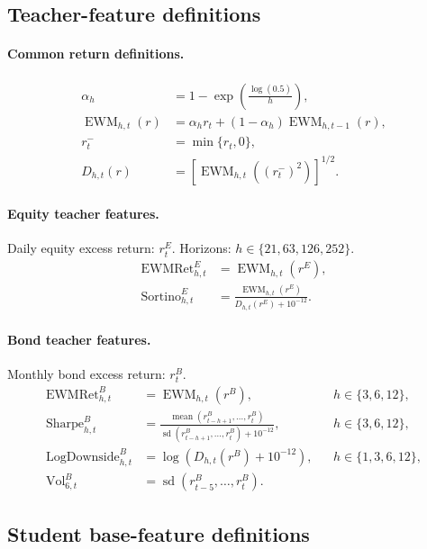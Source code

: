 \subsection{Teacher-feature definitions}
\label{app:teacher-feature-definitions}

\paragraph{Common return definitions.}
\begin{align}
\alpha_h
&=
1-\exp\!\left(\frac{\log(0.5)}{h}\right), \\
\operatorname{EWM}_{h,t}(r)
&=
\alpha_h r_t+(1-\alpha_h)\operatorname{EWM}_{h,t-1}(r), \\
r_t^{-}
&=
\min\{r_t,0\}, \\
D_{h,t}(r)
&=
\left[\operatorname{EWM}_{h,t}\!\left((r_t^{-})^2\right)\right]^{1/2}.
\end{align}

\paragraph{Equity teacher features.}
Daily equity excess return: \(r^E_t\). Horizons: \(h\in\{21,63,126,252\}\).
\begin{align}
\operatorname{EWMRet}^{E}_{h,t}
&=
\operatorname{EWM}_{h,t}(r^E), \\
\operatorname{Sortino}^{E}_{h,t}
&=
\frac{\operatorname{EWM}_{h,t}(r^E)}
{D_{h,t}(r^E)+10^{-12}} .
\end{align}

\paragraph{Bond teacher features.}
Monthly bond excess return: \(r^B_t\).
\begin{align}
\operatorname{EWMRet}^{B}_{h,t}
&=
\operatorname{EWM}_{h,t}(r^B),
&& h\in\{3,6,12\}, \\
\operatorname{Sharpe}^{B}_{h,t}
&=
\frac{
\operatorname{mean}(r^B_{t-h+1},\ldots,r^B_t)
}{
\operatorname{sd}(r^B_{t-h+1},\ldots,r^B_t)+10^{-12}
},
&& h\in\{3,6,12\}, \\
\operatorname{LogDownside}^{B}_{h,t}
&=
\log\!\left(D_{h,t}(r^B)+10^{-12}\right),
&& h\in\{1,3,6,12\}, \\
\operatorname{Vol}^{B}_{6,t}
&=
\operatorname{sd}(r^B_{t-5},\ldots,r^B_t).
\end{align}

\subsection{Student base-feature definitions}
\label{app:student-base-feature-definitions}

